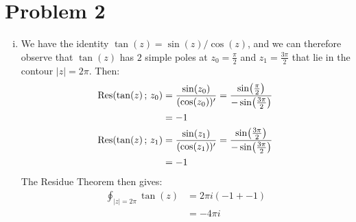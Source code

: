 \documentclass[letterpaper, titlepage, DIV=14]{scrartcl}
\begin{document}
    \section*{Problem 2}
    \begin{enumerate}[i)]
      \item
      We have the identity $\tan(z) = \sin(z)/\cos(z)$, and we can therefore observe that $\tan(z)$ has $2$ simple poles at
      $z_{0}=\frac{\pi}{2}$ and $z_{1}=\frac{3\pi}{2}$ that lie in the contour $|z|=2\pi$.  Then:
      \begin{align*}
        \Res(\tan(z) \, ; \, z_{0} ) &= \frac{\sin(z_{0})}{(\cos(z_{0}))'} = \frac{\sin(\frac{\pi}{2})}{-\sin(\frac{3\pi}{2})} \\
          &= -1 \\
        \Res(\tan(z) \, ; \, z_{1} ) &= \frac{\sin(z_{1})}{(\cos(z_{1}))'} = \frac{\sin(\frac{3\pi}{2})}{-\sin(\frac{3\pi}{2})} \\
          &= -1
      \end{align*}
      The Residue Theorem then gives:
      \begin{align*}
        \oint_{|z|=2\pi} \tan(z) &= 2\pi i (-1 + -1) \\
          &= -4\pi i
      \end{align*}
      

\end{enumerate}
\end{document}
